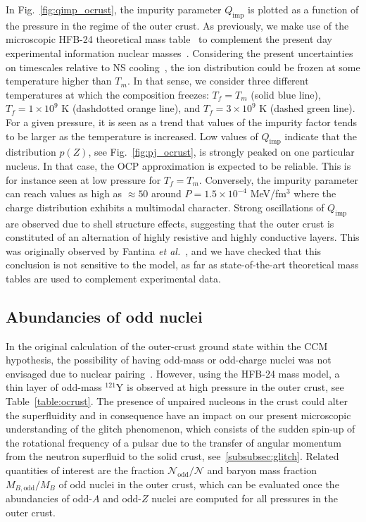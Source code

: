 In Fig.~\ref{fig:qimp_ocrust}, the impurity parameter $Q_{\text{imp}}$ is 
plotted as a function of the pressure in the regime of the outer crust. As
previously, we make use of the microscopic HFB-24 theoretical mass
table~\cite{Goriely2013} to complement the present day experimental
information nuclear masses~\cite{Huang2017,Welker2017}.
Considering the present uncertainties on timescales relative to NS 
cooling~\cite{Goriely2011}, the ion distribution could be frozen at some
temperature higher than $T_m$.
In that sense, we consider three different temperatures at which the 
composition freezes: $T_f = T_m$ (solid blue line), $T_f = 1\times 10^9$ K 
(dashdotted orange line), and $T_f = 3\times 10^9$ K (dashed green line).
For a given pressure, it is seen as a trend that values of the impurity factor
tends to be larger as the temperature is increased.
Low values of $Q_{\text{imp}}$ indicate that the distribution $p(Z)$, see
Fig.~\ref{fig:pj_ocrust}, is strongly peaked on one particular nucleus. In that 
case, the OCP approximation is expected to be reliable. This is for instance
seen at low pressure for $T_f = T_m$. Conversely, the impurity parameter 
can reach values as high as $\approx 50$ around $P=1.5\times 10^{-4}$ 
MeV/fm$^3$ where the charge distribution exhibits a multimodal 
character. 
Strong oscillations of $Q_{\text{imp}}$ are observed due to shell structure
effects, suggesting that the outer crust is constituted of an alternation of 
highly resistive and highly conductive layers. This was originally observed
by Fantina \textit{et al.}~\cite{Fantina2020}, and we have checked 
that this conclusion is not sensitive to the model, as far as state-of-the-art
theoretical mass tables are used to complement experimental data.

\subsection{Abundancies of odd nuclei}\label{subsec:odd_ocrust}

In the original calculation of the outer-crust ground state within the CCM
hypothesis, the possibility of having odd-mass or odd-charge nuclei was not 
envisaged due to nuclear pairing~\cite{BPS}.
However, using the HFB-24 mass model, a thin layer of odd-mass $^{121}$Y is 
observed at high pressure in the outer crust, see Table~\ref{table:ocrust}.
The presence of unpaired nucleons in the crust could alter the 
superfluidity and in consequence have an impact on our present microscopic 
understanding of the glitch phenomenon, which consists of the sudden 
spin-up of the rotational frequency of a pulsar due to the transfer of angular
momentum from the neutron superfluid to the solid crust, 
see~\ref{subsubsec:glitch}.
Related quantities of interest are the fraction 
$\mathcal{N}_{\text{odd}}/\mathcal{N}$ and baryon mass fraction 
$M_{B,\text{odd}}/M_B$ of odd nuclei in the outer crust, which can be evaluated 
once the abundancies of odd-$A$ and odd-$Z$ nuclei are computed for all 
pressures in the outer crust.
 
